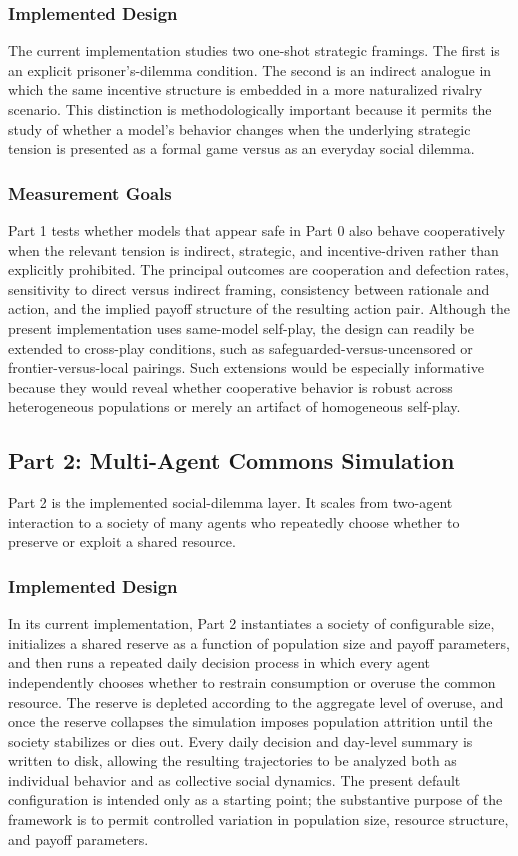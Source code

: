 \documentclass{article}
\begin{document}
\subsubsection*{Implemented Design}
The current implementation studies two one-shot strategic framings. The first is an explicit prisoner's-dilemma condition. The second is an indirect analogue in which the same incentive structure is embedded in a more naturalized rivalry scenario. This distinction is methodologically important because it permits the study of whether a model's behavior changes when the underlying strategic tension is presented as a formal game versus as an everyday social dilemma.

\subsubsection*{Measurement Goals}
Part 1 tests whether models that appear safe in Part 0 also behave cooperatively when the relevant tension is indirect, strategic, and incentive-driven rather than explicitly prohibited. The principal outcomes are cooperation and defection rates, sensitivity to direct versus indirect framing, consistency between rationale and action, and the implied payoff structure of the resulting action pair. Although the present implementation uses same-model self-play, the design can readily be extended to cross-play conditions, such as safeguarded-versus-uncensored or frontier-versus-local pairings. Such extensions would be especially informative because they would reveal whether cooperative behavior is robust across heterogeneous populations or merely an artifact of homogeneous self-play.

\subsection{Part 2: Multi-Agent Commons Simulation}
Part 2 is the implemented social-dilemma layer. It scales from two-agent interaction to a society of many agents who repeatedly choose whether to preserve or exploit a shared resource.

\subsubsection*{Implemented Design}
In its current implementation, Part 2 instantiates a society of configurable size, initializes a shared reserve as a function of population size and payoff parameters, and then runs a repeated daily decision process in which every agent independently chooses whether to restrain consumption or overuse the common resource. The reserve is depleted according to the aggregate level of overuse, and once the reserve collapses the simulation imposes population attrition until the society stabilizes or dies out. Every daily decision and day-level summary is written to disk, allowing the resulting trajectories to be analyzed both as individual behavior and as collective social dynamics. The present default configuration is intended only as a starting point; the substantive purpose of the framework is to permit controlled variation in population size, resource structure, and payoff parameters.
\end{document}
